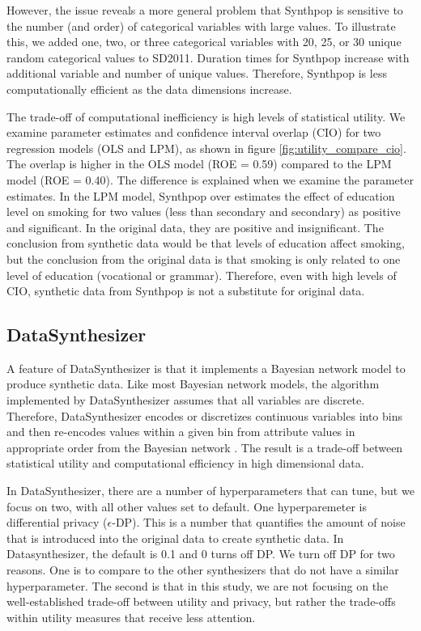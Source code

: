 \documentclass[runningheads]{llncs}
\begin{document}
However, the issue reveals a more general problem that Synthpop is sensitive to the number (and order) of categorical variables with large values.  To illustrate this, we added one, two, or three categorical variables with 20, 25, or 30 unique random categorical values to SD2011.  Duration times for Synthpop increase with additional variable and number of unique values.  Therefore, Synthpop is less computationally efficient as the data dimensions increase. 

The trade-off of computational inefficiency is high levels of statistical utility.  We examine parameter estimates and confidence interval overlap (CIO) for two regression models (OLS and LPM), as shown in figure \ref{fig:utility_compare_cio}.  The overlap is higher in the OLS model (ROE = 0.59) compared to the LPM model (ROE = 0.40).  The difference is explained when we examine the parameter estimates.  In the LPM model, Synthpop over estimates the effect of education level on smoking for two values (less than secondary and secondary) as positive and significant.  In the original data, they are positive and insignificant.  The conclusion from synthetic data would be that levels of education affect smoking, but the conclusion from  the original data is that smoking is only related to one level of education (vocational or grammar).  Therefore, even with high levels of CIO, synthetic data from Synthpop is not a substitute for original data.

\subsection{DataSynthesizer}\label{subsec:know_your_generator_datasynthesizer}

A feature of DataSynthesizer is that it implements a Bayesian network model to produce synthetic data.  Like most Bayesian network models, the algorithm implemented by DataSynthesizer assumes that all variables are discrete.  Therefore, DataSynthesizer encodes or discretizes continuous variables into bins and then re-encodes values within a given bin from attribute values in appropriate order from the Bayesian network \cite{ping2017datasynthesizer}.  The result is a trade-off between statistical utility and computational efficiency in high dimensional data.

In DataSynthesizer, there are a number of hyperparameters that can tune, but we focus on two, with all other values set to default.  One hyperparemeter is differential privacy ($\epsilon$-DP). This is a number that quantifies the amount of noise that is introduced into the original data to create synthetic data.  In Datasynthesizer, the default is 0.1 and 0 turns off DP.  We turn off DP for two reasons.  One is to compare to the other synthesizers that do not have a similar hyperparameter.  The second is that in this study, we are not focusing on the well-established trade-off between utility and privacy, but rather the trade-offs within utility measures that receive less attention.
\end{document}
